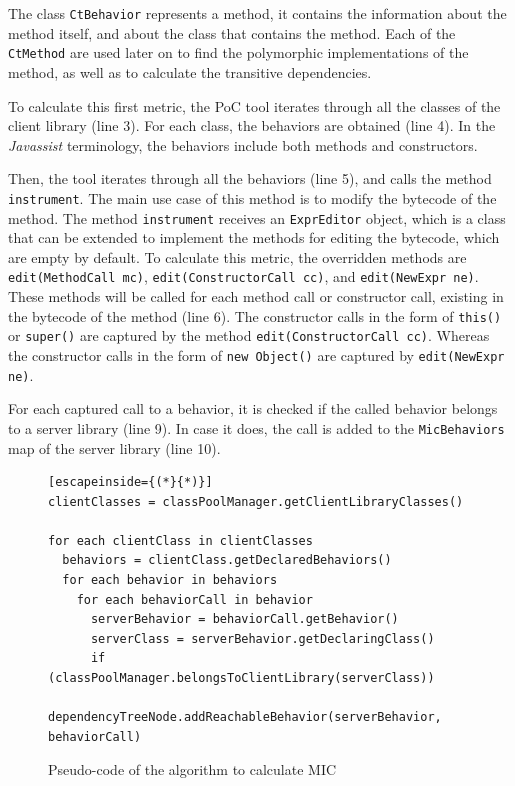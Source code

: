 The class \texttt{CtBehavior} represents a method, it contains the information about the method itself, and about the class that contains the method. Each of the \texttt{CtMethod} are used later on to find the polymorphic implementations of the method, as well as to calculate the transitive dependencies.

To calculate this first metric, the PoC tool iterates through all the classes of the client library (line 3). For each class, the behaviors are obtained (line 4). In the \textit{Javassist} terminology, the behaviors include both methods and constructors.

Then, the tool iterates through all the behaviors (line 5), and calls the method \texttt{instrument}. The main use case of this method is to modify the bytecode of the method. The method \texttt{instrument} receives an \texttt{ExprEditor} object, which is a class that can be extended to implement the methods for editing the bytecode, which are empty by default. To calculate this metric, the overridden methods are \texttt{edit(MethodCall mc)}, \texttt{edit(ConstructorCall cc)}, and \texttt{edit(NewExpr ne)}. These methods will be called for each method call or constructor call, existing in the bytecode of the method (line 6). The constructor calls in the form of \texttt{this()} or \texttt{super()} are captured by the method \texttt{edit(ConstructorCall cc)}. Whereas the constructor calls in the form of \texttt{new Object()} are captured by \texttt{edit(NewExpr ne)}.

For each captured call to a behavior, it is checked if the called behavior belongs to a server library (line 9). In case it does, the call is added to the \texttt{MicBehaviors} map of the server library (line 10).

\begin{figure}[ht!]
\begin{lstlisting}[escapeinside={(*}{*)}]
clientClasses = classPoolManager.getClientLibraryClasses()

for each clientClass in clientClasses
  behaviors = clientClass.getDeclaredBehaviors()
  for each behavior in behaviors
    for each behaviorCall in behavior
      serverBehavior = behaviorCall.getBehavior()
      serverClass = serverBehavior.getDeclaringClass()
      if (classPoolManager.belongsToClientLibrary(serverClass))
        dependencyTreeNode.addReachableBehavior(serverBehavior, behaviorCall)
\end{lstlisting}
\caption{Pseudo-code of the algorithm to calculate MIC}
\label{fig:algorithm-mic}
\end{figure}

